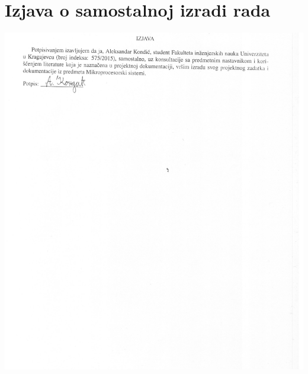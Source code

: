 \documentclass[a4paper, 12pt, oneside, titlepage]{article}
\begin{document}
    
    \setcounter{page}{2}
    \tableofcontents
    \clearpage
    
    
%     
    
    \section{Izjava o samostalnoj izradi rada}
    \begin{center}
      \includegraphics[width=\textwidth]{slike/scan}
      \label{fig:izjava_potpisana}
    \end{center}
    \pagebreak
    
\end{document}
